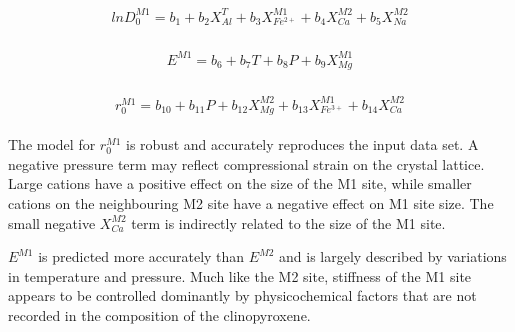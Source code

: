 \documentclass[final,authoryear,3p,times,twocolumn]{elsarticle}
\begin{document}
     \begin{align} %
	\begin{split}
   lnD^{M1}_0 = b_1 + b_{2}X^{T}_{Al} + b_3X^{M1}_{Fe^{2+}} + b_4X^{M2}_{Ca} + b_5X^{M2}_{Na}
   	\end{split}
	\label{D0M1_eqn}
	\end{align}
	
	\begin{align} %
	\begin{split}
   E^{M1} = b_6 + b_{7}T + b_8P + b_9X^{M1}_{Mg}
	\end{split}
	\label{EM1_eqn}
	\end{align}
	
	\begin{align} %
	\begin{split}
   r^{M1}_0 = b_{10} + b_{11}P + b_{12}X^{M2}_{Mg} + b_{13}X^{M1}_{Fe^{3+}} + b_{14}X^{M2}_{Ca}
	\end{split}
	\label{r0M1_eqn}
	\end{align}

The model for $r_0^{M1}$ is robust and accurately reproduces the input data set. A negative pressure term may reflect compressional strain on the crystal lattice. Large  cations have a positive effect on the size of the M1 site, while smaller  cations on the neighbouring M2 site have a negative effect on M1 site size. The small negative $X^{M2}_{Ca}$ term is indirectly related to the size of the M1 site.

$E^{M1}$ is predicted more accurately than $E^{M2}$ and is largely described by variations in temperature and pressure. Much like the M2 site, stiffness of the M1 site appears to be controlled dominantly by physicochemical factors that are not recorded in the composition of the clinopyroxene.
\end{document}
